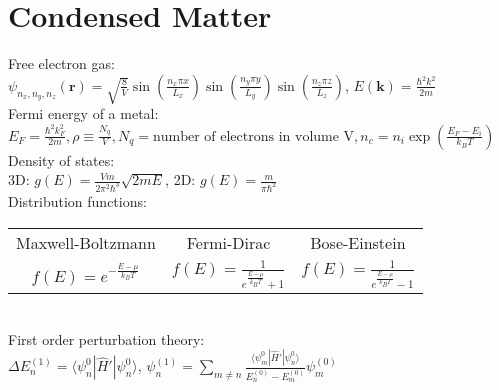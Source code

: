 \documentclass[12pt,a4paper]{article}
\begin{document}
\section*{Condensed Matter}
Free electron gas:\\[.15in]
$\psi_{n_x, n_y, n_z}(\mathbf{r}) = \sqrt{\frac{8}{V}} \sin\left(\frac{n_x \pi x}{L_x}\right) \sin\left(\frac{n_y \pi y}{L_y}\right) \sin\left(\frac{n_z \pi z}{L_z}\right)
$, \hspace*{5pt} $E(\mathbf{k}) = \frac{\hbar^2 k^2}{2m}
$\\[.15in]
Fermi energy of a metal:\\[.15in]
$E_F = \frac{\hbar^2 k_F^2}{2m}, \rho \equiv \frac{N_q}{V}, N_q = \text{number of electrons in volume V}, n_c = n_i \exp (\frac{E_F - E_i}{k_B T})$\\[.15in]
Density of states:\\[.15in]
3D: $g(E) = \frac{V m}{2\pi^2 \hbar^3} \sqrt{2mE}$, 2D: $g(E) = \frac{m}{\pi \hbar^2}$\\[.15in]
Distribution functions:\\
\begin{tabular}{ccc}
	Maxwell-Boltzmann & Fermi-Dirac & Bose-Einstein\\
	$f(E) = e^{-\frac{E - \mu}{k_B T}}$ & $f(E) = \frac{1}{e^{\frac{E - \mu}{k_B T}} + 1}$ & $f(E) = \frac{1}{e^{\frac{E - \mu}{k_B T}} - 1}
	$\\[.15in]
\end{tabular}\\[.15in]
First order perturbation theory:\\[.15in]
$\Delta E_n^{(1)} = \langle \psi_n^0 | \hat{H}' | \psi_n^0 \rangle$,
$\psi_n^{(1)} = \sum_{m \neq n} \frac{\langle \psi_m^0 | \hat{H}' | \psi_n^0 \rangle}{E_n^{(0)} - E_m^{(0)}} \psi_m^{(0)}$

	

	
\end{document}
